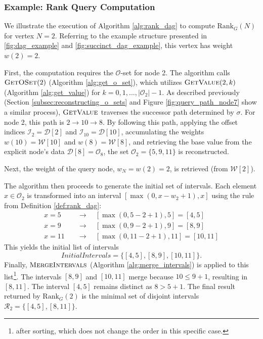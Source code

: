 \subsubsection*{Example: Rank Query Computation}
\label{subsubsec:rank_query_example_node2}

We illustrate the execution of Algorithm \ref{alg:rank_dag} to compute $\mathrm{Rank}_G(N)$ for vertex $N=2$. Referring to the example structure presented in \autoref{fig:dag_example} and \autoref{fig:succinct_dag_example}, this vertex has weight $w(2)=2$.

First, the computation requires the $\mathcal{O}$-set for node 2. The algorithm calls $\textsc{GetOSet}(2)$ (Algorithm \ref{alg:get_o_set}), which utilizes $\textsc{GetValue}(2, k)$ (Algorithm \ref{alg:get_value}) for $k=0, 1, \dots, |\mathcal{O}_2|-1$. As described previously (Section \ref{subsec:reconstructing_o_sets} and Figure \ref{fig:query_path_node7} show a similar process), $\textsc{GetValue}$ traverses the successor path determined by $\sigma$. For node 2, this path is $2 \to 10 \to 8$. By following this path, applying the offset indices $\mathcal{I}_2 = \mathcal{D}[2]$ and $\mathcal{I}_{10} = \mathcal{D}[10]$, accumulating the weights $w(10) = \mathcal{W}[10]$ and $w(8) = \mathcal{W}[8]$, and retrieving the base value from the explicit node's data $\mathcal{D}[8]=\mathcal{O}_8$, the set $\mathcal{O}_2 = \{5, 9, 11\}$ is reconstructed.

Next, the weight of the query node, $w_N = w(2) = 2$, is retrieved (from $\mathcal{W}[2]$).

The algorithm then proceeds to generate the initial set of intervals. Each element $x \in \mathcal{O}_2$ is transformed into an interval $[\max(0, x - w_2 + 1), x]$ using the rule from Definition \ref{def:rank_dag}:
\begin{align*}
    x=5 \quad  & \longrightarrow \quad [\max(0, 5 - 2 + 1), 5] = [4, 5]     \\
    x=9 \quad  & \longrightarrow \quad [\max(0, 9 - 2 + 1), 9] = [8, 9]     \\
    x=11 \quad & \longrightarrow \quad [\max(0, 11 - 2 + 1), 11] = [10, 11]
\end{align*}
This yields the initial list of intervals
\[InitialIntervals = \{ [4, 5], [8, 9], [10, 11] \}.\]
Finally, $\textsc{MergeIntervals}$ (Algorithm \ref{alg:merge_intervals}) is applied to this list\footnote{after sorting, which does not change the order in this specific case.}. The intervals $[8, 9]$ and $[10, 11]$ merge because $10 \le 9+1$, resulting in $[8, 11]$. The interval $[4, 5]$ remains distinct as $8 > 5+1$. The final result returned by $\mathrm{Rank}_G(2)$ is the minimal set of disjoint intervals $\mathcal{R}_2 = \{ [4, 5], [8, 11] \}$.
